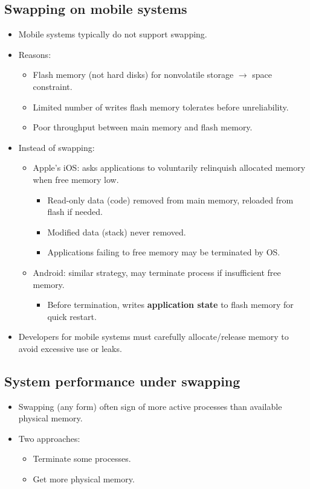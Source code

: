 \subsection{Swapping on mobile systems}
\begin{itemize}
    \item Mobile systems typically do not support swapping.
    \item Reasons:
    \begin{itemize}
        \item Flash memory (not hard disks) for nonvolatile storage $\rightarrow$ space constraint.
        \item Limited number of writes flash memory tolerates before unreliability.
        \item Poor throughput between main memory and flash memory.
    \end{itemize}
    \item Instead of swapping:
    \begin{itemize}
        \item Apple's iOS: asks applications to voluntarily relinquish allocated memory when free memory low.
        \begin{itemize}
            \item Read-only data (code) removed from main memory, reloaded from flash if needed.
            \item Modified data (stack) never removed.
            \item Applications failing to free memory may be terminated by OS.
        \end{itemize}
        \item Android: similar strategy, may terminate process if insufficient free memory.
        \begin{itemize}
            \item Before termination, writes \textbf{application state} to flash memory for quick restart.
        \end{itemize}
    \end{itemize}
    \item Developers for mobile systems must carefully allocate/release memory to avoid excessive use or leaks.
\end{itemize}

\subsection*{System performance under swapping}
\begin{itemize}
    \item Swapping (any form) often sign of more active processes than available physical memory.
    \item Two approaches:
    \begin{itemize}
        \item Terminate some processes.
        \item Get more physical memory.
    \end{itemize}
\end{itemize}

